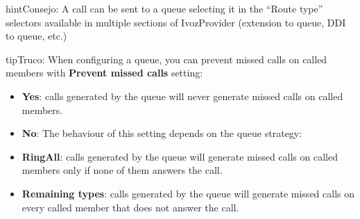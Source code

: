 \documentclass[letterpaper,10pt,spanish]{sphinxmanual}
\begin{document}
\begin{notice}{hint}{Consejo:}
A call can be sent to a queue selecting it in the ``Route type'' selectors
available in multiple sections of IvozProvider (extension to queue, DDI
to queue, etc.)
\end{notice}

\begin{notice}{tip}{Truco:}
When configuring a queue, you can prevent missed calls on called members with \textbf{Prevent missed calls} setting:
\begin{itemize}
\item {} 
\textbf{Yes}: calls generated by the queue will never generate missed calls on called members.

\item {} 
\textbf{No}: The behaviour of this setting depends on the queue strategy:

\item {} 
\textbf{RingAll}: calls generated by the queue will generate missed calls on called members only if none of them answers the call.

\item {} 
\textbf{Remaining types}: calls generated by the queue will generate missed calls on every called member that does not answer the call.

\end{itemize}
\end{notice}
\end{document}
